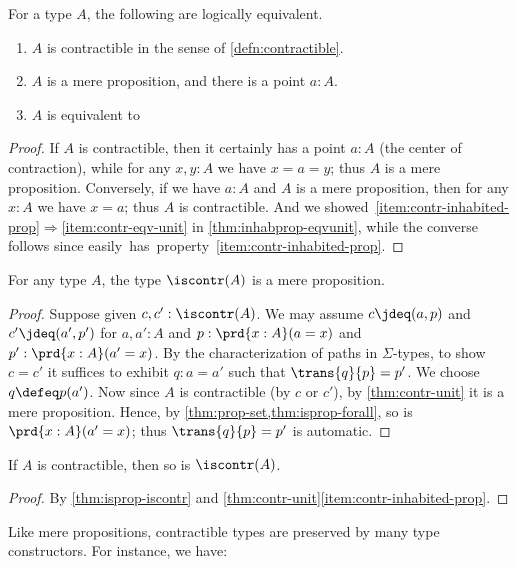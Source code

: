 \begin{lem}\label{thm:contr-unit}
  For a type $A$, the following are logically equivalent.
  \begin{enumerate}
  \item $A$ is contractible in the sense of \cref{defn:contractible}.\label{item:contr}
  \item $A$ is a mere proposition, and there is a point $a:A$.\label{item:contr-inhabited-prop}
  \item $A$ is equivalent to \unit.\label{item:contr-eqv-unit}
  \end{enumerate}
\end{lem}
\begin{proof}
  If $A$ is contractible, then it certainly has a point $a:A$ (the center of contraction), while for any $x,y:A$ we have $x=a=y$; thus $A$ is a mere proposition.
  Conversely, if we have $a:A$ and $A$ is a mere proposition, then for any $x:A$ we have $x=a$; thus $A$ is contractible.
  And we showed~\ref{item:contr-inhabited-prop}$\Rightarrow$\ref{item:contr-eqv-unit} in \cref{thm:inhabprop-eqvunit}, while the converse follows since \unit easily has property~\ref{item:contr-inhabited-prop}.
\end{proof}

\begin{lem}\label{thm:isprop-iscontr}
  For any type $A$, the type $\iscontr(A)$ is a mere proposition.
\end{lem}
\begin{proof}
  Suppose given $c,c':\iscontr(A)$.
  We may assume $c\jdeq(a,p)$ and $c'\jdeq(a',p')$ for $a,a':A$ and $p:\prd{x:A} (a=x)$ and $p':\prd{x:A} (a'=x)$.
  By the characterization of paths in $\Sigma$-types, to show $c=c'$ it suffices to exhibit $q:a=a'$ such that $\trans{q}{p}=p'$.
  We choose $q\defeq p(a')$.
  Now since $A$ is contractible (by $c$ or $c'$), by \cref{thm:contr-unit} it is a mere proposition.
  Hence, by \cref{thm:prop-set,thm:isprop-forall}, so is $\prd{x:A}(a'=x)$; thus $\trans{q}{p}=p'$ is automatic.
\end{proof}

\begin{cor}\label{thm:contr-contr}
  If $A$ is contractible, then so is $\iscontr(A)$.
\end{cor}
\begin{proof}
  By \cref{thm:isprop-iscontr} and \cref{thm:contr-unit}\ref{item:contr-inhabited-prop}.
\end{proof}

Like mere propositions, contractible types are preserved by many type constructors.
For instance, we have:

